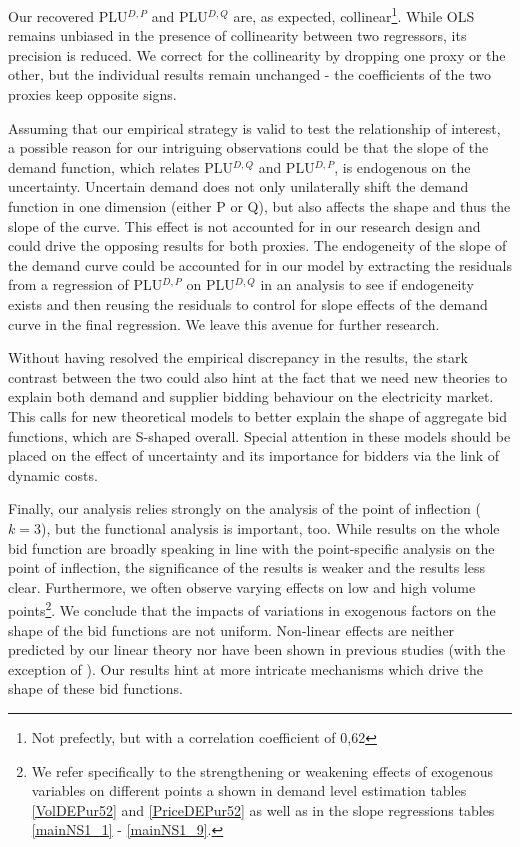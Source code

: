 Our recovered PLU$^{D,P}$ and PLU$^{D,Q}$ are, as expected, collinear\footnote{Not prefectly, but with a correlation coefficient of 0,62}. While OLS remains unbiased in the presence of collinearity between two regressors, its precision is reduced. We correct for the collinearity by dropping one proxy or the other, but the individual results remain unchanged - the coefficients of the two proxies keep opposite signs. 

Assuming that our empirical strategy is valid to test the relationship of interest, a possible reason for our intriguing observations could be that the slope of the demand function, which relates PLU$^{D,Q}$ and PLU$^{D,P}$, is endogenous on the uncertainty. Uncertain demand does not only unilaterally shift the demand function in one dimension (either P or Q), but also affects the shape and thus the slope of the curve. This effect is not accounted for in our research design and could drive the opposing results for both proxies. The endogeneity of the slope of the demand curve could be accounted for in our model by extracting the residuals from a regression of PLU$^{D,P}$ on PLU$^{D,Q}$ in an analysis to see if endogeneity exists and then reusing the residuals to control for slope effects of the demand curve in the final regression. We leave this  avenue for further research. 

Without having resolved the empirical discrepancy in the results, the stark contrast between the two could also hint at the fact that we need new theories to explain both demand and supplier bidding behaviour on the electricity market. This calls for new theoretical models to better explain the shape of aggregate bid functions, which are S-shaped overall. Special attention in these models should be placed on the effect of uncertainty and its importance for bidders via the link of dynamic costs. 



Finally, our analysis relies strongly on the analysis of the point of inflection ($k=3$), but the functional analysis is important, too. While results on the whole bid function are broadly speaking in line with the point-specific analysis on the point of inflection, the significance of the results is weaker and the results less clear. Furthermore, we often observe varying effects on low and high volume points\footnote{We refer specifically to the strengthening or weakening effects of exogenous variables on different points a shown in demand level estimation tables \ref{VolDEPur52} and \ref{PriceDEPur52}  as well as in the slope regressions tables \ref{mainNS1_1} - \ref{mainNS1_9}.}.
We conclude that the impacts of variations in exogenous factors on the shape of the bid functions are not uniform. Non-linear effects are neither predicted by our linear theory nor have been shown in previous studies (with the exception of \cite{wolfram1999measuring}). Our results hint at more intricate mechanisms which drive the shape of these bid functions. 


